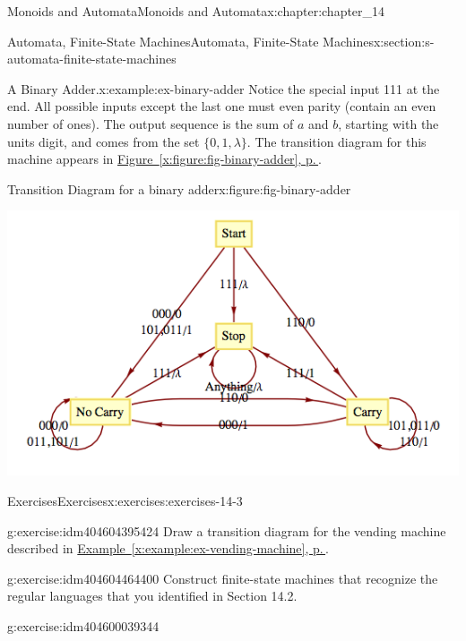 \documentclass[twoside,10pt,]{book}
\newcommand{\xreffont}{\relax}
\numberwithin{equation}{section}
\begin{document}
\begin{chapterptx}{Monoids and Automata}{}{Monoids and Automata}{}{}{x:chapter:chapter_14}
\begin{sectionptx}{Automata, Finite-State Machines}{}{Automata, Finite-State Machines}{}{}{x:section:s-automata-finite-state-machines}
\begin{example}{A Binary Adder.}{x:example:ex-binary-adder}
Notice the special input 111 at the end. All possible inputs except the last one must even parity (contain an even number of ones). The output sequence is the sum of \(a\) and \(b\), starting with the units digit, and comes from the set \(\{0,1,\lambda \}\). The transition diagram for this machine appears in \hyperref[x:figure:fig-binary-adder]{Figure~{\xreffont\ref{x:figure:fig-binary-adder}}, p.\,\pageref{x:figure:fig-binary-adder}}.%
\begin{figureptx}{Transition Diagram for a binary adder}{x:figure:fig-binary-adder}{}%
\begin{image}{0.1}{0.8}{0.1}%
\includegraphics[width=\linewidth]{images/fig-binary-adder.png}
\end{image}%
\tcblower
\end{figureptx}%
\end{example}
%
%
\typeout{************************************************}
\typeout{************************************************}
%
\begin{exercises-subsection}{Exercises}{}{Exercises}{}{}{x:exercises:exercises-14-3}
\begin{divisionexercise}{1}{}{}{g:exercise:idm404604395424}%
Draw a transition diagram for the vending machine described in \hyperref[x:example:ex-vending-machine]{Example~{\xreffont\ref{x:example:ex-vending-machine}}, p.\,\pageref{x:example:ex-vending-machine}}.%
\end{divisionexercise}%
\begin{divisionexercise}{2}{}{}{g:exercise:idm404604464400}%
Construct finite-state machines that recognize the regular languages that you identified in Section 14.2.%
\end{divisionexercise}%
\begin{divisionexercise}{3}{}{}{g:exercise:idm404600039344}%

\end{divisionexercise}
\end{exercises-subsection}
\end{sectionptx}
\end{chapterptx}
\end{document}
